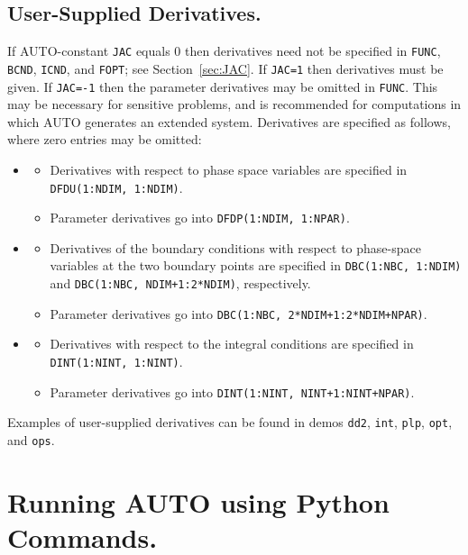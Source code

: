 \documentclass[12pt]{report}
\begin{document}
\section{ User-Supplied Derivatives.} \label{sec:derivatives}
If {\cal AUTO}-constant {\tt JAC} equals 0 
then derivatives need not be specified in 
{\tt FUNC}, {\tt BCND}, {\tt ICND}, and {\tt FOPT}; see Section~\ref{sec:JAC}.
If {\tt JAC=1} then derivatives must be given.
If {\tt JAC=-1} then the parameter derivatives may be omitted in 
{\tt FUNC}.
This may be necessary for sensitive 
problems, and is recommended for computations in which {\cal AUTO} 
generates an extended system.
Derivatives are specified as follows, where zero entries may be
omitted:
\begin{itemize}
\item[{\tt FUNC}]
\begin{itemize}
\item
 Derivatives with respect to phase space variables
  are specified in {\tt DFDU(1:NDIM, 1:NDIM)}.
\item
 Parameter derivatives go into {\tt DFDP(1:NDIM, 1:NPAR)}.
\end{itemize}
\item[{\tt BCND}]
\begin{itemize}
\item
Derivatives of the boundary conditions with respect to phase-space
variables at the two boundary points
are specified in {\tt DBC(1:NBC, 1:NDIM)} and {\tt DBC(1:NBC, NDIM+1:2*NDIM)},
respectively.
\item
Parameter derivatives go into {\tt DBC(1:NBC, 2*NDIM+1:2*NDIM+NPAR)}.
\end{itemize}
\item[{\tt ICND}]
\begin{itemize}
\item
Derivatives with respect to the integral conditions
are specified in {\tt DINT(1:NINT, 1:NINT)}.
\item
Parameter derivatives go into {\tt DINT(1:NINT, NINT+1:NINT+NPAR)}.
\end{itemize}
\end{itemize}
Examples of user-supplied derivatives can be found in
demos  {\tt dd2}, {\tt int}, {\tt plp}, {\tt opt}, and {\tt ops}.

\chapter{ Running {\cal AUTO} using Python Commands.} \label{ch:python_mode}
\end{document}
